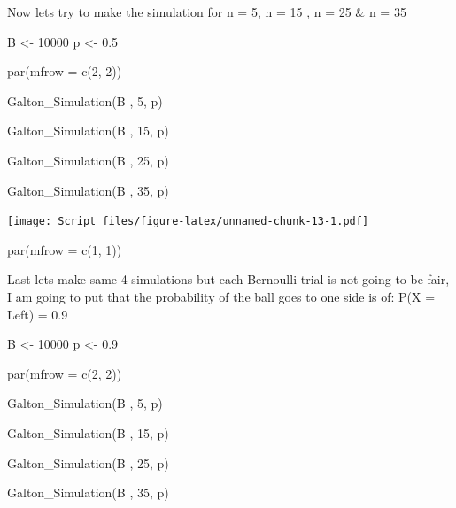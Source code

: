 \documentclass[
]{article}
\newenvironment{Shaded}{\begin{snugshade}}{\end{snugshade}}
\newcommand{\AttributeTok}[1]{\textcolor[rgb]{0.77,0.63,0.00}{#1}}
\newcommand{\DecValTok}[1]{\textcolor[rgb]{0.00,0.00,0.81}{#1}}
\newcommand{\FloatTok}[1]{\textcolor[rgb]{0.00,0.00,0.81}{#1}}
\newcommand{\FunctionTok}[1]{\textcolor[rgb]{0.00,0.00,0.00}{#1}}
\newcommand{\NormalTok}[1]{#1}
\newcommand{\OtherTok}[1]{\textcolor[rgb]{0.56,0.35,0.01}{#1}}
\begin{document}
Now lets try to make the simulation for n = 5, n = 15 , n = 25 \& n = 35

\begin{Shaded}
\begin{Highlighting}[]
\NormalTok{B }\OtherTok{\textless{}{-}} \DecValTok{10000}
\NormalTok{p }\OtherTok{\textless{}{-}} \FloatTok{0.5}

\FunctionTok{par}\NormalTok{(}\AttributeTok{mfrow =} \FunctionTok{c}\NormalTok{(}\DecValTok{2}\NormalTok{, }\DecValTok{2}\NormalTok{))}

\FunctionTok{Galton\_Simulation}\NormalTok{(B , }\DecValTok{5}\NormalTok{, p)}

\FunctionTok{Galton\_Simulation}\NormalTok{(B , }\DecValTok{15}\NormalTok{, p)}

\FunctionTok{Galton\_Simulation}\NormalTok{(B , }\DecValTok{25}\NormalTok{, p)}

\FunctionTok{Galton\_Simulation}\NormalTok{(B , }\DecValTok{35}\NormalTok{, p)}
\end{Highlighting}
\end{Shaded}

\texttt{[image: Script\_files/figure-latex/unnamed-chunk-13-1.pdf]}

\begin{Shaded}
\begin{Highlighting}[]
\FunctionTok{par}\NormalTok{(}\AttributeTok{mfrow =} \FunctionTok{c}\NormalTok{(}\DecValTok{1}\NormalTok{, }\DecValTok{1}\NormalTok{))}
\end{Highlighting}
\end{Shaded}

Last lets make same 4 simulations but each Bernoulli trial is not going
to be fair, I am going to put that the probability of the ball goes to
one side is of: P(X = Left) = 0.9

\begin{Shaded}
\begin{Highlighting}[]
\NormalTok{B }\OtherTok{\textless{}{-}} \DecValTok{10000}
\NormalTok{p }\OtherTok{\textless{}{-}} \FloatTok{0.9}

\FunctionTok{par}\NormalTok{(}\AttributeTok{mfrow =} \FunctionTok{c}\NormalTok{(}\DecValTok{2}\NormalTok{, }\DecValTok{2}\NormalTok{))}

\FunctionTok{Galton\_Simulation}\NormalTok{(B , }\DecValTok{5}\NormalTok{, p)}

\FunctionTok{Galton\_Simulation}\NormalTok{(B , }\DecValTok{15}\NormalTok{, p)}

\FunctionTok{Galton\_Simulation}\NormalTok{(B , }\DecValTok{25}\NormalTok{, p)}

\FunctionTok{Galton\_Simulation}\NormalTok{(B , }\DecValTok{35}\NormalTok{, p)}
\end{Highlighting}
\end{Shaded}
\end{document}
